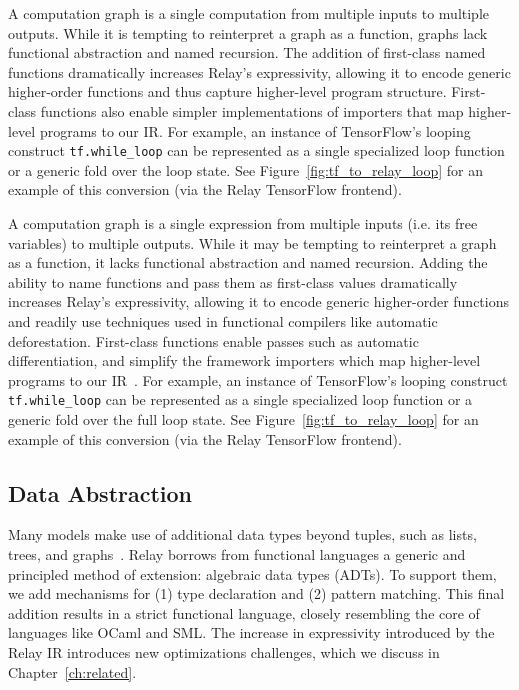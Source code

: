 A computation graph is a single computation
  from multiple inputs to multiple outputs.
While it is tempting to reinterpret a graph as a function,
  graphs lack functional abstraction and named recursion.
The addition of first-class named functions dramatically increases
  Relay's expressivity, allowing it to encode generic
  higher-order functions and thus capture higher-level program structure.
First-class functions also enable simpler implementations
  of importers that map higher-level programs to our IR.
For example, an instance of TensorFlow's looping construct \verb|tf.while_loop|
  can be represented as a single specialized loop function
  or a generic fold over the loop state.
See Figure~\ref{fig:tf_to_relay_loop} for an example of this conversion (via
  the Relay TensorFlow frontend).

A computation graph is a single expression
  from multiple inputs (i.e. its free variables) to multiple outputs.
While it may be tempting to reinterpret a graph as a function, it lacks functional abstraction
  and named recursion.
Adding the ability to name functions and pass them as first-class values dramatically increases
  Relay's expressivity, allowing it to encode generic
  higher-order functions and readily use techniques used in functional
  compilers like automatic deforestation.
First-class functions enable passes such as
  automatic differentiation, and simplify
  the framework importers which map higher-level programs to our IR~\citep{myia}.
For example, an instance of TensorFlow's looping construct \verb|tf.while_loop|
  can be represented as a single specialized loop function
  or a generic fold over the full loop state.
See Figure~\ref{fig:tf_to_relay_loop} for an example of this conversion (via
  the Relay TensorFlow frontend).

\subsection*{Data Abstraction}
Many models make use of additional data types beyond
  tuples, such as lists, trees, and graphs~\citep{char-rnn, tree_lstm, graph_lstm}.
Relay borrows from functional languages
  a generic and principled method of extension:
  algebraic data types (ADTs).
To support them, we add mechanisms for
  (1) type declaration and
  (2) pattern matching.
This final addition results in a strict functional language,
  closely resembling the core of languages like OCaml and SML.
The increase in expressivity introduced by the Relay IR introduces
  new optimizations challenges, which we
  discuss in Chapter~\ref{ch:related}.

